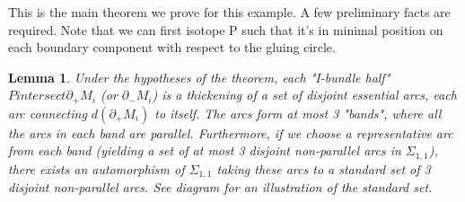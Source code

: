 \documentclass[12pt]{amsart}
\newtheorem{lemma}[theorem]{Lemma}
\theoremstyle{definition}
\newcommand{\bd}{\partial}
\newcommand{\Si}{\Sigma}
\begin{document}
This is the main theorem we prove for this example. A few preliminary facts are
required. Note that we can first isotope P such that it's in minimal position
on each boundary component with respect to the gluing circle.

\begin{lemma}

Under the hypotheses of the theorem, each "I-bundle half" $P intersect
\bd_+M_i$ (or $\bd_-M_i$) is a thickening of a set of disjoint essential arcs, each arc
connecting $d(\bd_+M_i)$ to itself. The arcs form at most 3 "bands", where all the
arcs in each band are parallel.  Furthermore, if we choose a representative arc
from each band (yielding a set of at most 3 disjoint non-parallel arcs in
$\Si_{1,1}$), there exists an automorphism of $\Si_{1,1}$ taking these arcs to a standard set
of 3 disjoint non-parallel arcs.  See diagram for an illustration of the
standard set.

\end{lemma}
\end{document}
